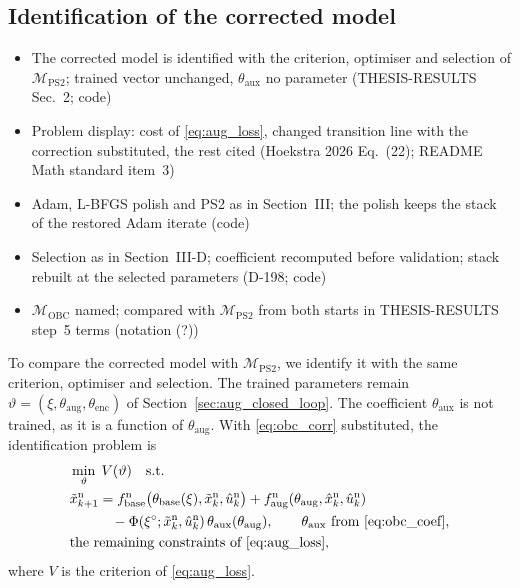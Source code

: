 \subsection{Identification of the corrected model}\label{sec:obc_problem}
\ifdraft
\begin{itemize}
\item The corrected model is identified with the criterion, optimiser and selection of $\mathcal M_{\mathrm{PS2}}$; trained vector unchanged, $\theta_{\mathrm{aux}}$ no parameter (THESIS-RESULTS Sec.~2; code)
\item Problem display: cost of \eqref{eq:aug_loss}, changed transition line with the correction substituted, the rest cited (Hoekstra 2026 Eq.~(22); README Math standard item~3)
\item Adam, L-BFGS polish and PS2 as in Section~III; the polish keeps the stack of the restored Adam iterate (code)
\item Selection as in Section~III-D; coefficient recomputed before validation; stack rebuilt at the selected parameters (D-198; code)
\item $\mathcal M_{\mathrm{OBC}}$ named; compared with $\mathcal M_{\mathrm{PS2}}$ from both starts in THESIS-RESULTS step~5 terms (notation (?))
\end{itemize}
\fi

To compare the corrected model with $\mathcal M_{\mathrm{PS2}}$, we identify
it with the same criterion, optimiser and selection.
The trained parameters remain
$\vartheta=(\xi,\theta_{\mathrm{aug}},\theta_{\mathrm{enc}})$ of
Section~\ref{sec:aug_closed_loop}.
The coefficient $\theta_{\mathrm{aux}}$ is not trained, as it is a function of
$\theta_{\mathrm{aug}}$.
With \eqref{eq:obc_corr} substituted, the identification problem is
\begin{equation}
\begin{aligned}
 &\min_{\vartheta}\;V(\vartheta)\quad\text{s.t.}\\
 &\tilde x^{\mathrm n}_{k+1}
 =f^{\mathrm n}_{\mathrm{base}}\bigl(\theta_{\mathrm{base}}(\xi),\tilde x^{\mathrm n}_k,\hat u^{\mathrm n}_k\bigr)
  +f^{\mathrm n}_{\mathrm{aug}}(\theta_{\mathrm{aug}},\hat x^{\mathrm n}_k,\hat u^{\mathrm n}_k)\\
 &\qquad\quad-\Phi(\xi^\circ;\tilde x^{\mathrm n}_k,\hat u^{\mathrm n}_k)\,
  \theta_{\mathrm{aux}}(\theta_{\mathrm{aug}}),
 \qquad\theta_{\mathrm{aux}}\text{ from }\eqref{eq:obc_coef},\\
 &\text{the remaining constraints of }\eqref{eq:aug_loss},
\end{aligned}
\label{eq:obc_problem}
\end{equation}
where $V$ is the criterion of \eqref{eq:aug_loss}.

